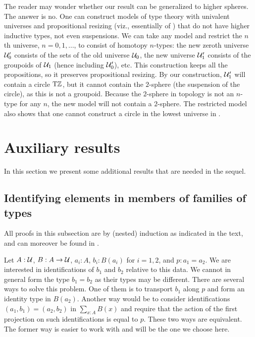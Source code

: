\documentclass[a4paper,12pt]{amsart}
\begin{document}
The reader may wonder whether our result can be generalized to higher spheres.
The answer is no.
One can construct models of type theory with univalent universes and propositional resizing
(viz., essentially of \UniMath{})
that do not have higher inductive types, not even suspensions.
We can take any model and restrict the $n$th universe, $n=0,1,\dots$,
to consist of homotopy $n$-types:
the new zeroth universe $\mathcal{U}'_0$ consists of the sets of the old universe $\mathcal{U}_0$,
the new universe $\mathcal{U}'_1$ consists of the groupoids of $\mathcal{U}_1$ (hence including $\mathcal{U}'_0$),
etc.
This construction keeps all the propositions, so it preserves propositional resizing.
By our construction, $\mathcal{U}'_1$ will contain a circle ${\mathrm{T}\mathbb{Z}}$,
but it cannot contain the $2$-sphere (the suspension of the circle),
as this is not a groupoid.
Because the $2$-sphere in topology is not an $n$-type for any $n$,
the new model will not contain a $2$-sphere.
The restricted model also shows that one cannot construct a circle in
the lowest universe in \UniMath{}.

\section{Auxiliary results}
\label{sec:auxiliaries}

In this section we present some additional results that are needed in the sequel.

\subsection{Identifying elements in members of families of types}
\label{sec:pathovers}


All proofs in this subsection are by (nested) induction as indicated in the text,
and can moreover be found in \cite[\href{https://github.com/UniMath/UniMath/blob/master/UniMath/MoreFoundations/PathsOver.v}{PathsOver.v}]{UniMath}.

Let $A : \mathcal{U}$, $B : A \to \mathcal{U}$, $a_i:A$, $b_i:B(a_i)$ for $i=1,2$, and $p : a_1 = a_2$.
We are interested in identifications of $b_1$ and $b_2$ relative to this data.
We cannot in general form the type $b_1 = b_2$ as their types may be different.
There are several ways to solve this problem. One of them is to transport $b_1$ along
$p$ and form an identity type in $B(a_2)$. Another way would be to consider
identifications $(a_1,b_1) = (a_2,b_2)$ in $\sum_{x:A} B(x)$ and require that the
action of the first projection on such identifications is equal to $p$.
These two ways are equivalent.
The former way is easier to work with and will be the one we choose here.
\end{document}

